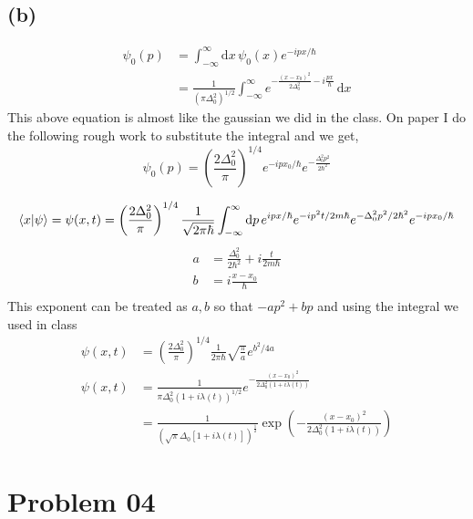 \documentclass[letter, 10pts]{article}
\newcommand{\hb}{\hbar}
\begin{document}
\subsection*{(b)} 

\begin{align*}
	\psi_0(p) &= \int_{-\infty}^{\infty} \mathrm{d} x\,
	\psi_0 (x) e^{- i p x / \hb } \\ &=
\frac{1}{(\pi \Delta_0 ^2)^{1 / 2 }} 
\int_{-\infty}^{\infty} e^{- \frac{(x- x_0)^2}{2 \Delta_0^2} - i \frac{p x}{\hb}} 
\, \mathrm{d} x
\end{align*}
This above equation is almost like the gaussian we did in the class. On paper I do the following rough work to substitute the integral and we get, 
\[\boxed{
\psi_0(p) = 
\left(
\frac{2 \Delta_0^2}{ \pi }
\right)^{1 / 4} e^{ - i p x_0 / \hb } e^{ - \frac{\Delta_0 ^2 p^2}{2 \hb ^2}}
}\] 

\begin{align*}
	\braket{x | \psi} = 
	\psi(x,t) = 
	\left(\frac{2 \Delta_0^2 }{\pi }\right)^{1 / 4} 
	\frac{1}{\sqrt{2 \pi \hb}  } 
	\int_{-\infty}^{\infty} \mathrm{d} p \, 
	e^{i p x / \hb} 
	e^{- i p^2 t / 2 m \hb } 
	e^{- \Delta_0 ^2 p^2 / 2 \hb ^2}
	e^{ - i p x_0 / \hb } 
\end{align*}
\begin{align*}
	a &= \frac{\Delta_0^2}{2 \hb ^2} + i \frac{t}{2 m \hb} \\
	b &= i \frac{x - x_0}{\hb} \\
\end{align*}
This exponent can be treated as $a, b$ so that $-a p^2 + bp $ and using the integral we used in class
\begin{align*}
	\psi(x,t) &= \left(\frac{2 \Delta_0^2}{\pi }\right)^{1 / 4} \frac{1}{2 \pi \hb } 
	\sqrt{\frac{\pi }{a}}  e^{b^2 / 4a} \\
	\psi(x,t) &=
	\frac{1}{\pi \Delta_0 ^2 (1 + i \lambda(t ) ) ^{1 / 2}} 
	e^{ - \frac{(x-x_0) ^2}{2 \Delta_0 ^2 (1 + i \lambda (t))}}
\\ &=
\frac{1}{( 
	\sqrt{\pi } \Delta_0 [1 + i \lambda(t)]  
)^{\frac{1}{2}} }
\exp
\left(
- 
\frac{
	(x-x_0) ^2
}{2 \Delta_0^2 (1 + i \lambda(t ) ) }
\right)
\end{align*}
\section*{Problem 04}
\end{document}
